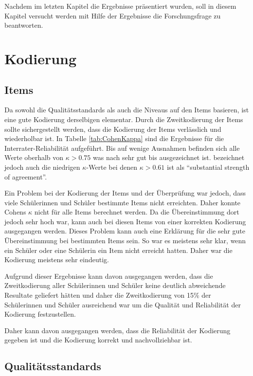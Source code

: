 

Nachdem im letzten Kapitel die Ergebnisse präsentiert wurden, soll in diesem Kapitel versucht werden mit Hilfe der Ergebnisse die Forschungsfrage zu beantworten.

\section{Kodierung}

\subsection{Items}

Da sowohl die Qualitätsstandards als auch die Niveaus auf den Items basieren, ist eine gute Kodierung derselbigen elementar. Durch die Zweitkodierung der Items sollte sichergestellt werden, dass die Kodierung der Items verlässlich und wiederholbar ist. In Tabelle \ref{tab:CohenKappa} sind die Ergebnisse für die Interrater-Reliabilität aufgeführt. Bis auf wenige Ausnahmen befinden sich alle Werte oberhalb von $\kappa > 0.75$ was nach \citet[S.111]{Greve1997} sehr gut bis ausgezeichnet ist. \citet{Landis1977} bezeichnet jedoch auch die niedrigen $\kappa$-Werte bei denen $\kappa > 0.61$ ist als "`substantial strength of agreement"'. 

Ein Problem bei der Kodierung der Items und der Überprüfung war jedoch, dass viele Schülerinnen und Schüler bestimmte Items nicht erreichten. Daher konnte Cohens $\kappa$ nicht für alle Items berechnet werden. Da die Übereinstimmung dort jedoch sehr hoch war, kann auch bei diesen Items von einer korrekten Kodierung ausgegangen werden. Dieses Problem kann auch eine Erklärung für die sehr gute Übereinstimmung bei bestimmten Items sein. So war es meistens sehr klar, wenn ein Schüler oder eine Schülerin ein Item nicht erreicht hatten. Daher war die Kodierung meistens sehr eindeutig.

Aufgrund dieser Ergebnisse kann davon ausgegangen werden, dass die Zweitkodierung aller Schülerinnen und Schüler keine deutlich abweichende Resultate geliefert hätten und daher die Zweitkodierung von 15\% der Schülerinnen und Schüler ausreichend war um die Qualität und Reliabilität der Kodierung festzustellen.

Daher kann davon ausgegangen werden, dass die Reliabilität der Kodierung gegeben ist und die Kodierung korrekt und nachvollziehbar ist.

\subsection{Qualitätsstandards}

